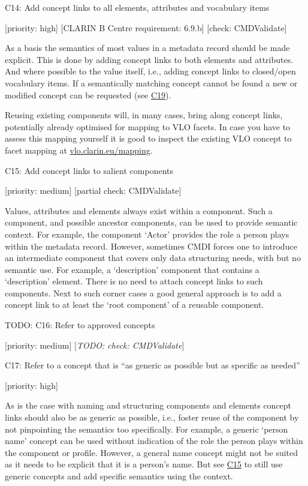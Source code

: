C14: Add concept links to all elements, attributes and vocabulary items

{[}priority: high{]} {[}CLARIN B Centre requirement: 6.9.b{]} {[}check:
CMDValidate{]}

As a basis the semantics of most values in a metadata record should be
made explicit. This is done by adding concept links to both elements and
attributes. And where possible to the value itself, i.e., adding concept
links to closed/open vocabulary items. If a semantically matching
concept cannot be found a new or modified concept can be requested (see
\protect\hyperlink{c19}{C19}).

Reusing existing components will, in many cases, bring along concept
links, potentially already optimised for mapping to VLO facets. In case
you have to assess this mapping yourself it is good to inspect the
existing VLO concept to facet mapping at
\href{http://vlo.clarin.eu/mapping}{vlo.clarin.eu/mapping}.

C15: Add concept links to salient components

{[}priority: medium{]} {[}partial check: CMDValidate{]}

Values, attributes and elements always exist within a component. Such a
component, and possible ancestor components, can be used to provide
semantic context. For example, the component `Actor' provides the role a
person plays within the metadata record. However, sometimes CMDI forces
one to introduce an intermediate component that covers only data
structuring needs, with but no semantic use. For example, a
`description' component that contains a `description' element. There is
no need to attach concept links to such components. Next to such corner
cases a good general approach is to add a concept link to at least the
`root component' of a reusable component.

TODO: C16: Refer to approved concepts

{[}priority: medium{]} {[}\emph{TODO: check: CMDValidate}{]}

C17: Refer to a concept that is ``as generic as possible but as specific
as needed''

{[}priority: high{]}

As is the case with naming and structuring components and elements
concept links should also be as generic as possible, i.e., foster reuse
of the component by not pinpointing the semantics too specifically. For
example, a generic `person name' concept can be used without indication
of the role the person plays within the component or profile. However, a
general name concept might not be suited as it needs to be explicit that
it is a person's name. But see \protect\hyperlink{c15}{C15} to still use
generic concepts and add specific semantics using the context.

